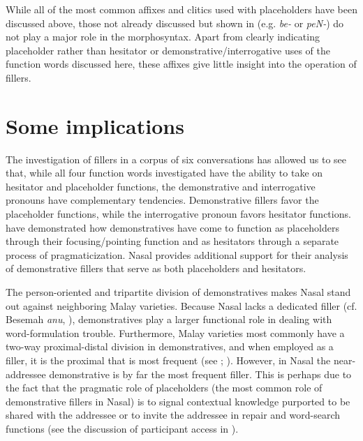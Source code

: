 \documentclass[output=paper,colorlinks,citecolor=brown
\ChapterDOI{10.5281/zenodo.15697585}
]{langscibook}
\begin{document}
While all of the most common affixes and clitics used with placeholders have been discussed above, those not already discussed but shown in  (e.g. \textit{be-} or \textit{peN-}) do not play a major role in the morphosyntax. Apart from clearly indicating placeholder rather than hesitator or demonstrative/interrogative uses of the function words discussed here, these affixes give little insight into the operation of fillers.

\section{Some implications}\label{sec:implications}
The investigation of fillers in a corpus of six conversations has allowed us to see that, while all four function words investigated have the ability to take on hesitator and placeholder functions, the demonstrative and interrogative pronouns have complementary tendencies. Demonstrative fillers favor the placeholder functions, while the interrogative pronoun favors hesitator functions. \citet{hayashi2006crosslinguistic} have demonstrated how demonstratives have come to function as placeholders through their focusing/pointing function and as hesitators through a separate process of pragmaticization. Nasal provides additional support for their analysis of demonstrative fillers that serve as both placeholders and hesitators.

The person-oriented and tripartite division of demonstratives makes Nasal stand out against neighboring Malay varieties. Because Nasal lacks a dedicated filler (cf. Besemah \textit{anu}, \cite{chapters/mcdonnell_billings}), demonstratives play a larger functional role in dealing with word-formulation trouble. Furthermore, Malay varieties most commonly have a two-way proximal-distal division in demonstratives, and when employed as a filler, it is the proximal that is most frequent (see \cite{chapters/mcdonnell_billings}; \cite{wouk2005syntax}). However, in Nasal the near-addressee demonstrative is by far the most frequent filler. This is perhaps due to the fact that the pragmatic role of placeholders (the most common role of demonstrative fillers in Nasal) is to signal contextual knowledge purported to be shared with the addressee or to invite the addressee in repair and word-search functions (see the discussion of participant access in \cite{hayashi2006crosslinguistic}). %
\end{document}
